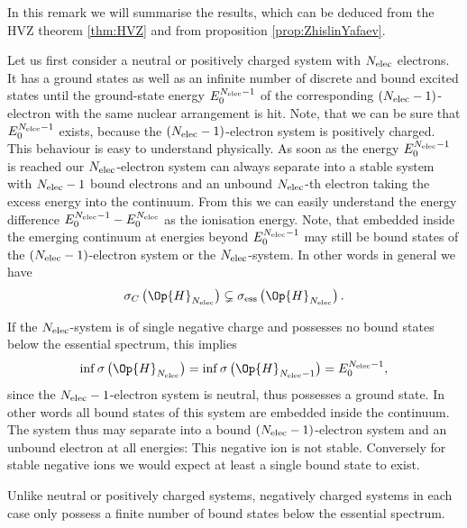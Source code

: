 \begin{rem}
	In this remark we will summarise the results,
	which can be deduced from the HVZ theorem \ref{thm:HVZ}
	and from proposition \vref{prop:ZhislinYafaev}.

	Let us first consider a neutral or positively charged
	system with $N_\text{elec}$ electrons.
	It has a ground states as well as an infinite number
	of discrete and bound excited states
	until the ground-state energy $E^{N_\text{elec}-1}_0$
	of the corresponding $(N_\text{elec}-1)$-electron
	with the same nuclear arrangement is hit.
	Note, that we can be sure that $E^{N_\text{elec}-1}_0$
	exists, because the $(N_\text{elec}-1)$-electron system
	is positively charged.
	This behaviour is easy to understand physically.
	As soon as the energy $E^{N_\text{elec}-1}_0$ is reached
	our $N_\text{elec}$-electron system can always
	separate into a stable system with $N_\text{elec}-1$
	bound electrons and an unbound $N_\text{elec}$-th electron
	taking the excess energy into the continuum.
	From this we can easily understand the energy difference
	$E^{N_\text{elec}-1}_0 - E^{N_\text{elec}}_0$
	as the ionisation energy.
	Note, that embedded inside the emerging continuum
	at energies beyond $E^{N_\text{elec}-1}_0$
	may still be bound states of the $(N_\text{elec}-1)$-electron system
	or the $N_\text{elec}$-system.
	In other words in general we have
	\[ \sigma_C\left(\Op{H}_{\Nelec}\right)
		\subsetneq \sigma_\text{ess}\left(\Op{H}_{\Nelec}\right). \]

	If the $N_\text{elec}$-system is of single negative charge
	and possesses no bound states below the essential spectrum,
	this implies
	\[ \inf \sigma\left(\Op{H}_{\Nelec}\right)
		= \inf \sigma\left(\Op{H}_{\Nelec-1}\right) = E^{\Nelec-1}_0, \]
	since the $N_\text{elec}-1$-electron system is neutral,
	thus possesses a ground state.
	In other words all bound states of this system
	are embedded inside the continuum.
	The system thus may separate into a bound $(N_\text{elec}-1)$-electron system
	and an unbound electron at all energies:
	This negative ion is not stable.
	Conversely for stable negative ions
	we would expect at least a single bound state to exist.

	Unlike neutral or positively charged systems,
	negatively charged systems in each case only possess a
	finite number of bound states below
	the essential spectrum.


\end{rem}
